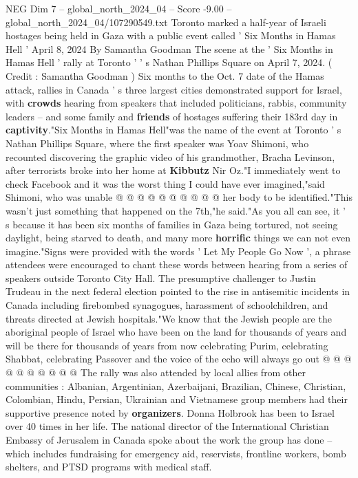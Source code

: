 \begin{textsample}{NEG Dim 7 – global\_north\_2024\_04 – Score -9.00 – global\_north\_2024\_04/107290549.txt}  \label{ex:f7_neg_226}
Toronto marked a half-year of Israeli hostages being held in Gaza with a public event called ' Six Months in Hamas Hell ' April 8, 2024 By Samantha Goodman The scene at the ' Six Months in Hamas Hell ' rally at Toronto ' ' s Nathan Phillips Square on April 7, 2024. ( Credit : Samantha Goodman ) Six months to the Oct. 7 date of the Hamas attack, rallies in Canada ' s three largest cities demonstrated support for Israel, with \textbf{crowds} hearing from speakers that included politicians, rabbis, community leaders -- and some family and \textbf{friends} of hostages suffering their 183rd day in \textbf{captivity}."Six Months in Hamas Hell"was the name of the event at Toronto ' s Nathan Phillips Square, where the first speaker was Yoav Shimoni, who recounted discovering the graphic video of his grandmother, Bracha Levinson, after terrorists broke into her home at \textbf{Kibbutz} Nir Oz."I immediately went to check Facebook and it was the worst thing I could have ever imagined,"said Shimoni, who was unable @ @ @ @ @ @ @ @ @ @ her body to be identified."This wasn't just something that happened on the 7th,"he said."As you all can see, it ' s because it has been six months of families in Gaza being tortured, not seeing daylight, being starved to death, and many more \textbf{horrific} things we can not even imagine."Signs were provided with the words ' Let My People Go Now ', a phrase attendees were encouraged to chant these words between hearing from a series of speakers outside Toronto City Hall.
The presumptive challenger to Justin Trudeau in the next federal election pointed to the rise in antisemitic incidents in Canada including firebombed synagogues, harassment of schoolchildren, and threats directed at Jewish hospitals."We know that the Jewish people are the aboriginal people of Israel who have been on the land for thousands of years and will be there for thousands of years from now celebrating Purim, celebrating Shabbat, celebrating Passover and the voice of the echo will always go out @ @ @ @ @ @ @ @ @ @ The rally was also attended by local allies from other communities : Albanian, Argentinian, Azerbaijani, Brazilian, Chinese, Christian, Colombian, Hindu, Persian, Ukrainian and Vietnamese group members had their supportive presence noted by \textbf{organizers}.
Donna Holbrook has been to Israel over 40 times in her life.
The national director of the International Christian Embassy of Jerusalem in Canada spoke about the work the group has done -- which includes fundraising for emergency aid, reservists, frontline workers, bomb shelters, and PTSD programs with medical staff.

\end{textsample}
